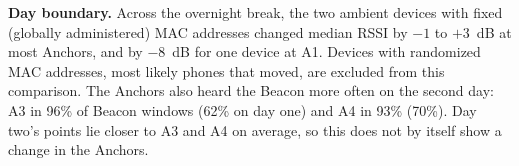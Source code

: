 \textbf{Day boundary.} Across the overnight break, the two ambient devices with fixed (globally administered) MAC addresses changed median RSSI by $-1$ to $+3$~dB at most Anchors, and by $-8$~dB for one device at A1. Devices with randomized MAC addresses, most likely phones that moved, are excluded from this comparison. The Anchors also heard the Beacon more often on the second day: A3 in 96\% of Beacon windows (62\% on day one) and A4 in 93\% (70\%). Day two's points lie closer to A3 and A4 on average, so this does not by itself show a change in the Anchors.
